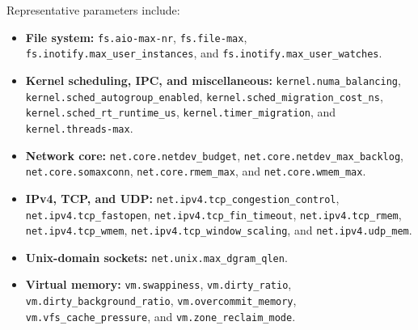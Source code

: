 \documentclass[sigplan,10pt]{acmart}
\newcommand{\sysctl}[1]{\texttt{\nolinkurl{#1}}}
\begin{document}
Representative parameters include:
\begin{itemize}
    \item \textbf{File system:}
    \sysctl{fs.aio-max-nr},
    \sysctl{fs.file-max},
    \sysctl{fs.inotify.max_user_instances},
    and \sysctl{fs.inotify.max_user_watches}.

    \item \textbf{Kernel scheduling, IPC, and miscellaneous:}
    \sysctl{kernel.numa_balancing},
    \sysctl{kernel.sched_autogroup_enabled},
    \sysctl{kernel.sched_migration_cost_ns},
    \sysctl{kernel.sched_rt_runtime_us},
    \sysctl{kernel.timer_migration},
    and \sysctl{kernel.threads-max}.

    \item \textbf{Network core:}
    \sysctl{net.core.netdev_budget},
    \sysctl{net.core.netdev_max_backlog},
    \sysctl{net.core.somaxconn},
    \sysctl{net.core.rmem_max},
    and \sysctl{net.core.wmem_max}.

    \item \textbf{IPv4, TCP, and UDP:}
    \sysctl{net.ipv4.tcp_congestion_control},
    \sysctl{net.ipv4.tcp_fastopen},
    \sysctl{net.ipv4.tcp_fin_timeout},
    \sysctl{net.ipv4.tcp_rmem},
    \sysctl{net.ipv4.tcp_wmem},
    \sysctl{net.ipv4.tcp_window_scaling},
    and \sysctl{net.ipv4.udp_mem}.

    \item \textbf{Unix-domain sockets:}
    \sysctl{net.unix.max_dgram_qlen}.

    \item \textbf{Virtual memory:}
    \sysctl{vm.swappiness},
    \sysctl{vm.dirty_ratio},
    \sysctl{vm.dirty_background_ratio},
    \sysctl{vm.overcommit_memory},
    \sysctl{vm.vfs_cache_pressure},
    and \sysctl{vm.zone_reclaim_mode}.
\end{itemize}
\end{document}
